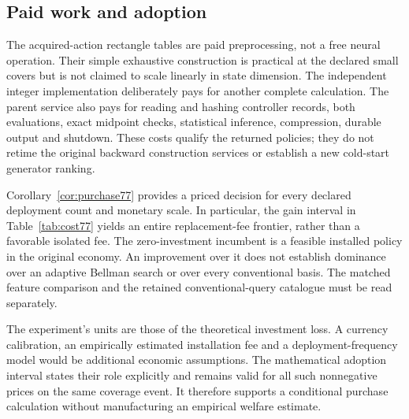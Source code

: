 \subsection{Paid work and adoption}



The acquired-action rectangle tables are paid preprocessing, not a free neural operation. Their simple exhaustive construction is practical at the declared small covers but is not claimed to scale linearly in state dimension. The independent integer implementation deliberately pays for another complete calculation. The parent service also pays for reading and hashing controller records, both evaluations, exact midpoint checks, statistical inference, compression, durable output and shutdown. These costs qualify the returned policies; they do not retime the original backward construction services or establish a new cold-start generator ranking.

Corollary~\ref{cor:purchase77} provides a priced decision for every declared deployment count and monetary scale. In particular, the gain interval in Table~\ref{tab:cost77} yields an entire replacement-fee frontier, rather than a favorable isolated fee. The zero-investment incumbent is a feasible installed policy in the original economy. An improvement over it does not establish dominance over an adaptive Bellman search or over every conventional basis. The matched feature comparison and the retained conventional-query catalogue must be read separately.

The experiment's units are those of the theoretical investment loss. A currency calibration, an empirically estimated installation fee and a deployment-frequency model would be additional economic assumptions. The mathematical adoption interval states their role explicitly and remains valid for all such nonnegative prices on the same coverage event. It therefore supports a conditional purchase calculation without manufacturing an empirical welfare estimate.
